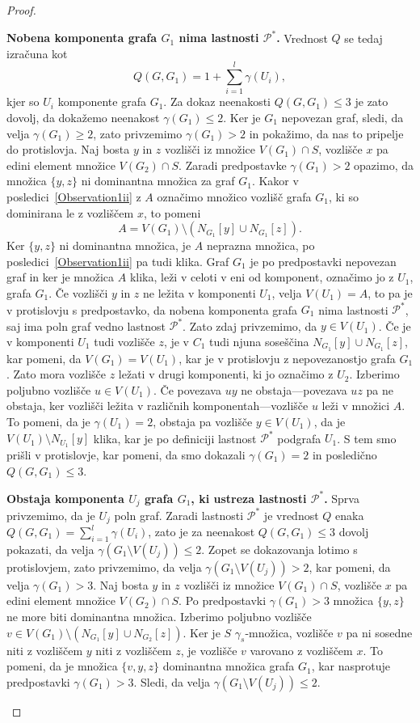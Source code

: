 \documentclass[12pt,a4paper,twoside]{article}
\theoremstyle{definition} %
\theoremstyle{plain} %
\numberwithin{equation}{section}  %
\begin{document}
\begin{proof}
\begin{itemize}
\textbf{Nobena komponenta grafa $G_1$ nima lastnosti $\mathcal{P^*}$.} Vrednost $Q$ se tedaj izračuna kot $$Q(G, G_1) = 1 + \sum\limits_{i=1}^l \gamma(U_i),$$ kjer so $U_i$ komponente grafa $G_1$. Za dokaz neenakosti $Q(G, G_1) \leq 3$ je zato dovolj, da dokažemo neenakost $\gamma(G_1) \leq 2$. Ker je $G_1$ nepovezan graf, sledi, da velja $\gamma(G_1) \geq 2$, zato privzemimo $\gamma(G_1) > 2$ in pokažimo, da nas to pripelje do protislovja. Naj bosta $y$ in $z$ vozlišči iz množice $V(G_1) \cap S$, vozlišče $x$ pa edini element množice  $V(G_2) \cap S$. Zaradi predpostavke $\gamma(G_1) > 2$ opazimo, da množica $\{y, z\}$ ni dominantna množica za graf $G_1$. Kakor v posledici~\ref{Observation1ii} z $A$ označimo množico vozlišč grafa $G_1$, ki so dominirana le z vozliščem $x$, to pomeni $$A = V(G_1) \setminus (N_{G_1}[y] \cup N_{G_1}[z] ).$$ Ker $\{y, z\}$ ni dominantna množica, je $A$ neprazna množica, po posledici~\ref{Observation1ii} pa tudi klika. Graf $G_1$ je po predpostavki nepovezan graf in ker je množica $A$ klika, leži v celoti v eni od komponent, označimo jo z $U_1$, grafa $G_1$. Če vozlišči $y$ in  $z$ ne ležita v komponenti $U_1$, velja $V(U_1) = A$, to pa je v protislovju s predpostavko, da nobena komponenta grafa $G_1$ nima lastnosti $\mathcal{P^*}$, saj ima poln graf vedno lastnost $\mathcal{P^*}$. Zato zdaj privzemimo, da $y \in V(U_1)$. Če je v komponenti $U_1$ tudi vozlišče $z$, je v $C_1$ tudi njuna soseščina $N_{G_1}[y] \cup N_{G_1}[z]$, kar pomeni, da $V(G_1) = V(U_1)$, kar je v protislovju z nepovezanostjo grafa $G_1$. Zato mora vozlišče $z$ ležati v drugi komponenti, ki jo označimo z $U_2$. Izberimo poljubno vozlišče $u \in V(U_1)$. Če povezava $uy$ ne obstaja---povezava $uz$ pa ne obstaja, ker vozlišči ležita v različnih komponentah---vozlišče $u$ leži v množici $A$. To pomeni, da je $\gamma(U_1) = 2$, obstaja pa vozlišče $y \in V(U_1)$, da je $V(U_1) \setminus N_{U_1} [y]$ klika, kar je po definiciji lastnost $\mathcal{P^*}$ podgrafa $U_1$. S tem smo prišli v protislovje, kar pomeni, da smo dokazali $\gamma(G_1) = 2$ in posledično $Q(G, G_1) \leq 3$.

\medskip
\textbf{Obstaja komponenta $U_j$ grafa $G_1$, ki ustreza lastnosti $\mathcal{P^*}$.} Sprva privzemimo, da je $U_j$ poln graf. Zaradi lastnosti $\mathcal{P^*}$ je vrednost $Q$ enaka $Q(G, G_1) = \sum\limits_{i=1}^l \gamma(U_i)$, zato je za neenakost $Q(G, G_1) \leq 3$ dovolj pokazati, da velja $\gamma(G_1 \setminus V(U_j)) \leq 2$. Zopet se dokazovanja lotimo s protislovjem, zato privzemimo, da velja $\gamma(G_1 \setminus V(U_j)) > 2$, kar pomeni, da velja $\gamma(G_1) > 3$. Naj bosta $y$ in $z$ vozlišči iz množice $V(G_1) \cap S$, vozlišče $x$ pa edini element množice  $V(G_2) \cap S$. Po predpostavki $\gamma(G_1) > 3$ množica $\{y, z\}$ ne more biti dominantna množica. Izberimo poljubno vozlišče $v \in V(G_1) \setminus (N_{G_1}[y] \cup N_{G_2}[z])$. Ker je $S$ $\gamma_s$-množica, vozlišče $v$ pa ni sosedne niti z vozliščem $y$ niti z vozliščem $z$, je vozlišče $v$ varovano z vozliščem $x$. To pomeni, da je množica $\{v, y, z\}$ dominantna množica grafa $G_1$, kar nasprotuje predpostavki $\gamma(G_1) > 3$. Sledi, da velja $\gamma(G_1 \setminus V(U_j)) \leq 2$.


\end{itemize}
\end{proof}
\end{document}
